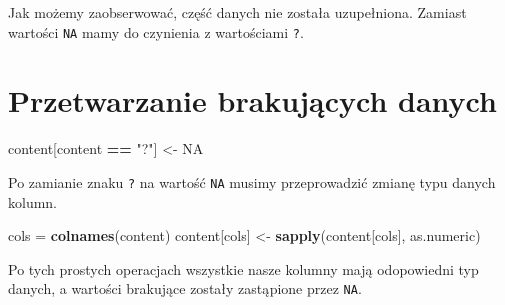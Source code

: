 \documentclass[]{article}
\newenvironment{Shaded}{\begin{snugshade}}{\end{snugshade}}
\newcommand{\KeywordTok}[1]{\textcolor[rgb]{0.13,0.29,0.53}{\textbf{#1}}}
\newcommand{\NormalTok}[1]{#1}
\newcommand{\OperatorTok}[1]{\textcolor[rgb]{0.81,0.36,0.00}{\textbf{#1}}}
\newcommand{\OtherTok}[1]{\textcolor[rgb]{0.56,0.35,0.01}{#1}}
\newcommand{\StringTok}[1]{\textcolor[rgb]{0.31,0.60,0.02}{#1}}
\begin{document}
Jak możemy zaobserwować, część danych nie została uzupełniona. Zamiast
wartości \texttt{NA} mamy do czynienia z wartościami \texttt{?}.

\hypertarget{przetwarzanie-brakujux105cych-danych}{%
\section{Przetwarzanie brakujących
danych}\label{przetwarzanie-brakujux105cych-danych}}

\begin{Shaded}
\begin{Highlighting}[]
\NormalTok{content[content }\OperatorTok{==}\StringTok{ "?"}\NormalTok{] <-}\StringTok{ }\OtherTok{NA}
\end{Highlighting}
\end{Shaded}

Po zamianie znaku \texttt{?} na wartość \texttt{NA} musimy przeprowadzić
zmianę typu danych kolumn.

\begin{Shaded}
\begin{Highlighting}[]
\NormalTok{cols =}\StringTok{ }\KeywordTok{colnames}\NormalTok{(content)}
\NormalTok{content[cols] <-}\StringTok{ }\KeywordTok{sapply}\NormalTok{(content[cols], as.numeric)}
\end{Highlighting}
\end{Shaded}

Po tych prostych operacjach wszystkie nasze kolumny mają odopowiedni typ
danych, a wartości brakujące zostały zastąpione przez \texttt{NA}.
\end{document}
